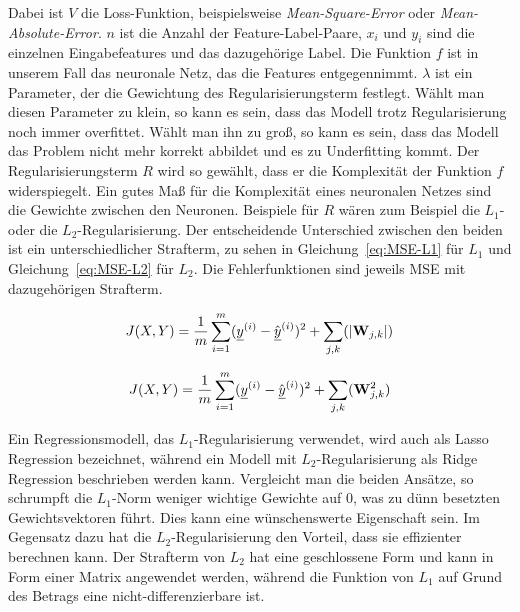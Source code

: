 Dabei ist \(V\) die Loss-Funktion, beispielsweise \textit{Mean-Square-Error} oder \textit{Mean-Absolute-Error}.
\(n\) ist die Anzahl der Feature-Label-Paare,
\(x_i\) und \(y_i\) sind die einzelnen Eingabefeatures und das dazugehörige Label.
Die Funktion \(f\) ist in unserem Fall das neuronale Netz, das die Features entgegennimmt.
\(\lambda\) ist ein Parameter, der die Gewichtung des Regularisierungsterm festlegt.
Wählt man diesen Parameter zu klein, so kann es sein, dass das Modell trotz Regularisierung noch immer overfittet.
Wählt man ihn zu groß, so kann es sein, dass das Modell das Problem nicht mehr korrekt abbildet und es zu Underfitting kommt.
Der Regularisierungsterm \(R\) wird so gewählt, dass er die Komplexität der Funktion \(f\) widerspiegelt.
Ein gutes Maß für die Komplexität eines neuronalen Netzes sind die Gewichte zwischen den Neuronen.
Beispiele für \(R\) wären zum Beispiel die \(L_1\)- oder die \(L_2\)-Regularisierung. %
Der entscheidende Unterschied zwischen den beiden ist ein unterschiedlicher Strafterm, zu sehen in Gleichung~\eqref{eq:MSE-L1} für \(L_1\) und Gleichung~\eqref{eq:MSE-L2} für \(L_2\). 
Die Fehlerfunktionen sind jeweils MSE mit dazugehörigen Strafterm.

\begin{equation} \label{eq:MSE-L1}
	J(X, Y) = \frac{1}{m} \sum_{i=1}^{m} ({\underline{y}}^{(i)} - \hat{{\underline{y}}}^{(i)})^2 + \sum_{j, k} (|{{\mathbf{W}}}_{j,k}|)
\end{equation} 

\begin{equation} \label{eq:MSE-L2}
	J(X, Y) = \frac{1}{m} \sum_{i=1}^{m} ({\underline{y}}^{(i)} - \hat{{\underline{y}}}^{(i)})^2 + \sum_{j, k} ({{\mathbf{W}}}_{j,k}^2)
\end{equation} 


Ein Regressionsmodell, das \(L_1\)-Regularisierung verwendet, wird auch als Lasso Regression bezeichnet, 
während ein Modell mit \(L_2\)-Regularisierung als Ridge Regression beschrieben werden kann.
Vergleicht man die beiden Ansätze, so schrumpft die \(L_1\)-Norm weniger wichtige Gewichte auf 0, was zu dünn besetzten Gewichtsvektoren führt.
Dies kann eine wünschenswerte Eigenschaft sein.
Im Gegensatz dazu hat die \(L_2\)-Regularisierung den Vorteil, dass sie effizienter berechnen kann.
Der Strafterm von \(L_2\) hat eine geschlossene Form und kann in Form einer Matrix angewendet werden, während die Funktion von \(L_1\) auf Grund des Betrags eine nicht-differenzierbare ist.


